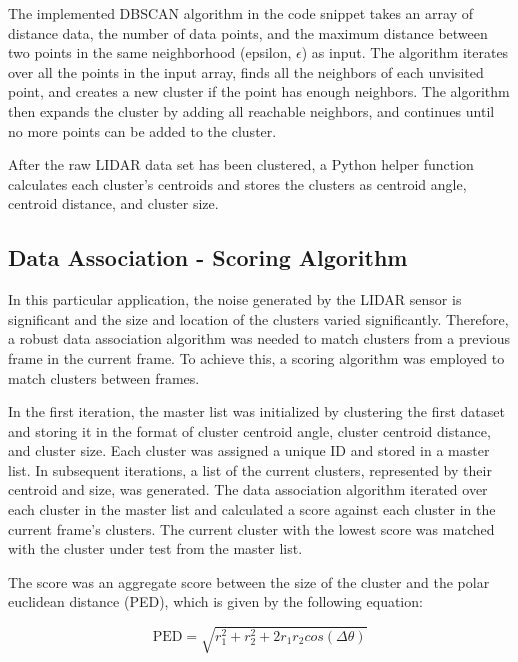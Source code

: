 \documentclass[journal]{IEEEtran} %
\begin{document}
The implemented DBSCAN algorithm in the code snippet takes an array of distance data, the number of data points, and the maximum distance between two points in the same neighborhood (epsilon, $\epsilon$) as input. The algorithm iterates over all the points in the input array, finds all the neighbors of each unvisited point, and creates a new cluster if the point has enough neighbors. The algorithm then expands the cluster by adding all reachable neighbors, and continues until no more points can be added to the cluster.

After the raw LIDAR data set has been clustered, a Python helper function calculates each cluster's centroids and stores the clusters as centroid angle, centroid distance, and cluster size. 

\subsection{Data Association - Scoring Algorithm}

In this particular application, the noise generated by the LIDAR sensor is significant and the size and location of the clusters varied significantly. Therefore, a robust data association algorithm was needed to match clusters from a previous frame in the current frame. To achieve this, a scoring algorithm was employed to match clusters between frames.


In the first iteration, the master list was initialized by clustering the first dataset and storing it in the format of cluster centroid angle, cluster centroid distance, and cluster size. Each cluster was assigned a unique ID and stored in a master list. In subsequent iterations, a list of the current clusters, represented by their centroid and size, was generated. The data association algorithm iterated over each cluster in the master list and calculated a score against each cluster in the current frame's clusters. The current cluster with the lowest score was matched with the cluster under test from the master list.

The score was an aggregate score between the size of the cluster and the polar euclidean distance (PED), which is given by the following equation:

\[
\text{PED} = \sqrt{r_1^2 + r_2^2+2r_1r_2cos(\Delta\theta)}
\]
\end{document}
